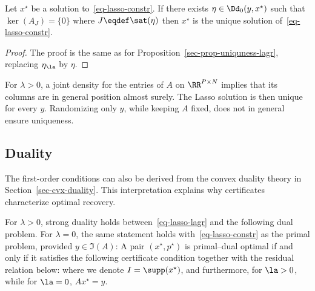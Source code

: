\begin{prop}\label{sec-prop-uniquness-constr}
 	Let $x^\star$ be a solution to~\eqref{eq-lasso-constr}. If there exists $\eta \in \Dd_0(y,x^\star)$ such that 
	$\ker(A_{J})=\{0\}$ where $J \eqdef \sat(\eta)$ then $x^\star$ is the unique solution of~\eqref{eq-lasso-constr}.
\end{prop}
\begin{proof}
	The proof is the same as for Proposition~\ref{sec-prop-uniquness-lagr}, replacing $\eta_\la$ by $\eta$. 
\end{proof}

For $\lambda>0$, a joint density for the entries of $A$ on $\RR^{P\times N}$ implies that its columns are in general position almost surely. The Lasso solution is then unique for every $y$. Randomizing only $y$, while keeping $A$ fixed, does not in general ensure uniqueness.



\subsection{Duality}
\label{sec-duality-lasso}

The first-order conditions can also be derived from the convex duality theory in Section~\ref{sec-cvx-duality}. This interpretation explains why certificates characterize optimal recovery.


\begin{thm}
	For $\lambda>0$, strong duality holds between~\eqref{eq-lasso-lagr} and the following dual problem. For $\lambda=0$, the same statement holds with~\eqref{eq-lasso-constr} as the primal problem, provided $y\in\Im(A)$:
	A pair $(x^\star,p^\star)$ is primal--dual optimal if and only if it satisfies the following certificate condition together with the residual relation below:
	where we denote $I=\supp(x^\star)$,
	and furthermore, for $\la>0$, 
	while for $\la=0$, $Ax^\star=y$.
\end{thm}

